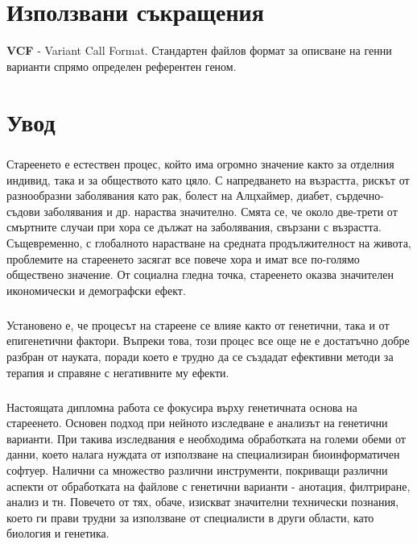 \documentclass[pdftex,cyrillic,14pt,a4page,twoside]{extreport}
\newcommand\blankpage{%
    \null
    \thispagestyle{empty}%
    \newpage}
\begin{document}
\afterpage{\blankpage}


\tableofcontents
\pagebreak

\setlength\parindent{0pt}

\chapter*{Използвани съкращения}
\textbf{VCF} - Variant Call Format. Стандартен файлов формат за описване на генни варианти спрямо определен референтен геном.\\

\chapter{Увод}
\paragraph{}

Стареенето е естествен процес, който има огромно значение както за отделния индивид, така и за обществото като цяло. С напредването на възрастта, рискът от разнообразни заболявания като рак, болест на Алцхаймер, диабет, сърдечно-съдови заболявания и др. нараства значително. Смята се, че около две-трети от смъртните случаи при хора се дължат на заболявания, свързани с възрастта. Същевременно, с глобалното нарастване на средната продължителност на живота, проблемите на стареенето засягат все повече хора и имат все по-голямо обществено значение. От социална гледна точка, стареенето оказва значителен икономически и демографски ефект.

\paragraph{}
Установено е, че процесът на стареене се влияе както от генетични, така и от епигенетични фактори. Въпреки това, този процес все още не е достатъчно добре разбран от науката, поради което е трудно да се създадат ефективни методи за терапия и справяне с негативните му ефекти.

\paragraph{}
Настоящата дипломна работа се фокусира върху генетичната основа на стареенето. Основен подход при нейното изследване е анализът на генетични варианти. При такива изследвания е необходима обработката на големи обеми от данни, което налага нуждата от използване на специализиран биоинформатичен софтуер. Налични са множество различни инструменти, покриващи различни аспекти от обработката на файлове с генетични варианти - анотация, филтриране, анализ и тн. Повечето от тях, обаче, изискват значителни технически познания, което ги прави трудни за използване от специалисти в други области, като биология и генетика.
\end{document}
